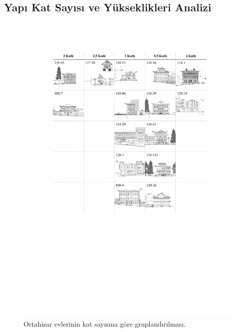 \documentclass[12pt,turkish,a4paperpaper,]{report}
\begin{document}
\hypertarget{yapux131-kat-sayux131sux131-ve-yuxfckseklikleri-analizi}{%
\subsection{Yapı Kat Sayısı ve Yükseklikleri
Analizi}\label{yapux131-kat-sayux131sux131-ve-yuxfckseklikleri-analizi}}

\begin{figure}
\centering
\includegraphics[width=1\textwidth,height=\textheight]{source/figures/katgruplandirma.pdf}
\caption{Ortahisar evlerinin kat sayısına göre gruplandırılması.
\label{katgruplama}}
\end{figure}
\end{document}
